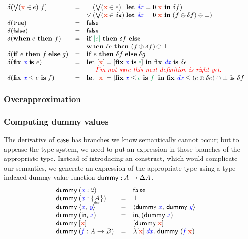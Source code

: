 \documentclass{article}
\theoremstyle{plain}
\theoremstyle{definition}
\newcommand{\dummy}{\ms{dummy}}
\newcommand{\preserve}[1]{{\color{ForestGreen}{#1}}}
\newcommand{\preservedisc}[1]{\preserve{\disc{#1}}}
\newcommand{\comment}[1]{\textit{--- {#1}}}
\begin{document}
\[\begin{array}{lcll}
  \delta(\setelim{\d{x}}{e}{f})
  &=& \phantom{\vee~} (\setelim{\d{x}}{e}
        {\phantom{\delta} \letv{\m{dx}}{\zero\; \d{x}} \delta f})\\
  && \vee~ (\setelim{\d{x}}{\delta e}
        {\letv{\m{dx}}{\zero\; \d{x}}
          (f \oplus \delta f) \ominus \unit})\\

  \delta(\etrue) &=& \efalse\\
  \delta(\efalse) &=& \efalse\\
  \delta(\when{e}{f})
  &=& \ifthen{\preservedisc{e}}{\delta f}{}\\
  && \when{\delta e}{(f \oplus \delta f) \ominus \unit}
  \\
  \delta(\ifthen{e}{f}{g}) &=& \ifthen{e}{\delta f}{\delta g}\\
  \delta(\fix{\m{x}}{e}) &=&
  \letdisc{\d{x}}
          {\disc{\fix{\m{x}} \preserve{e}}}
          {\fix{\m{dx}} \delta e}\\
  && \todo{\comment{I'm not sure this next definition is right yet.}}\\
  \delta(\fixle{\m{x}}{e}{f}) &=&
    \letdisc{\d x}{\disc{\fixle{\m x}{\preserve{e}}{\preserve{f}}}}
    \fixle{\m{dx}}{(e \oplus \delta e) \ominus \unit}{\delta f}
\end{array}
\]


\subsubsection{Overapproximation}



\subsubsection{Computing dummy values}

The derivative of $\mathsf{case}$ has branches we know semantically cannot occur; but to appease the type system, we need to put an expression in those branches of the appropriate type.
%
Instead of introducing an  construct, which would complicate our semantics, we generate an expression of the appropriate type using a type-indexed dummy-value function $\dummy{} : A \to \Ch{A}$.
%
\[
\begin{array}{lcl}
  \dummy\; (\m{x} : \tbool) &=& \efalse\\
  \dummy\; (\m{x} : \Seteq{A}) &=& \unit\\
  \dummy\; \pair{\m{x}}{\m{y}} &=& \pair{\dummy\;\m{x}}{\dummy\;\m{y}}\\
  \dummy\; (\inj{i}{\m{x}}) &=& \inj{i}{(\dummy\;\m{x})}\\
  \dummy\; \disc{\d{x}} &=& \disc{\dummy\; \d{x}}\\
  \dummy\; (\m{f} : A \to B) &=&
    \fn \disc{\d{x}} \, \m{dx} \binder\, \dummy\;(\m{f}\;\d{x})
\end{array}
\]
\end{document}
